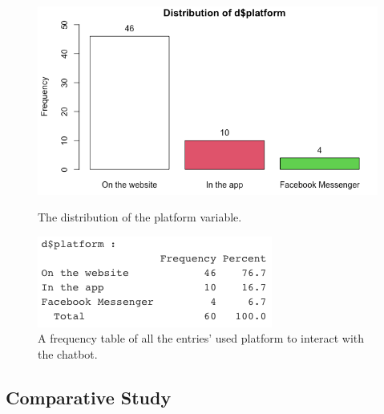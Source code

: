 \begin{figure}[!htb]
	\includegraphics[width=\linewidth]{../LaTeX/Figures/Environments/PlatformPlot.png}
	\caption{The distribution of the platform variable.}\label{fig:platformPlot}
	\endminipage\hfill
	\includegraphics[width=\linewidth]{../LaTeX/Figures/Environments/PlatformFreq.png}
	\caption{A frequency table of all the entries' used platform to interact with the chatbot.}\label{fig:platformFreq}
	\endminipage\hfill
\end{figure}

\FloatBarrier
\subsection{Comparative Study}
